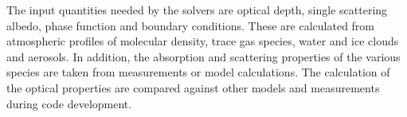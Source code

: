 The input quantities needed by the solvers are optical depth, single
scattering albedo, phase function and boundary conditions. These are
calculated from atmospheric profiles of molecular density, trace gas
species, water and ice clouds and aerosols. In addition,
the absorption and scattering properties of the various species are
taken from measurements or model calculations. The calculation of the
optical properties are compared against other models and measurements
during code development.



